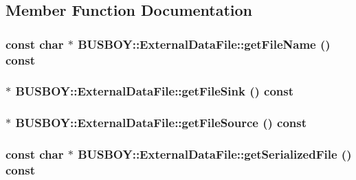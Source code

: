 \subsection{Member Function Documentation}
\hypertarget{classBUSBOY_1_1ExternalDataFile_a0e40aff3e3ffa38a7b80d8bc2d812641}{
\subsubsection[{getFileName}]{\setlength{\rightskip}{0pt plus 5cm}const char $\ast$ BUSBOY::ExternalDataFile::getFileName () const}}
\label{classBUSBOY_1_1ExternalDataFile_a0e40aff3e3ffa38a7b80d8bc2d812641}
\hypertarget{classBUSBOY_1_1ExternalDataFile_acda0c4e130fb1effd902f3bc8a5820e0}{
\subsubsection[{getFileSink}]{ $\ast$ BUSBOY::ExternalDataFile::getFileSink () const}}
\label{classBUSBOY_1_1ExternalDataFile_acda0c4e130fb1effd902f3bc8a5820e0}
\hypertarget{classBUSBOY_1_1ExternalDataFile_a1f4d152e6746e61a9ccfad2d0df23276}{
\subsubsection[{getFileSource}]{ $\ast$ BUSBOY::ExternalDataFile::getFileSource () const}}
\label{classBUSBOY_1_1ExternalDataFile_a1f4d152e6746e61a9ccfad2d0df23276}
\hypertarget{classBUSBOY_1_1ExternalDataFile_ab6c68b49bee602513e89349482986b50}{
\subsubsection[{getSerializedFile}]{\setlength{\rightskip}{0pt plus 5cm}const char $\ast$ BUSBOY::ExternalDataFile::getSerializedFile () const}}
